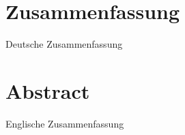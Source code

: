 \thispagestyle{plain}
\onehalfspacing
\section*{Zusammenfassung}
 Deutsche Zusammenfassung


\section*{Abstract}
Englische Zusammenfassung

\singlespacing